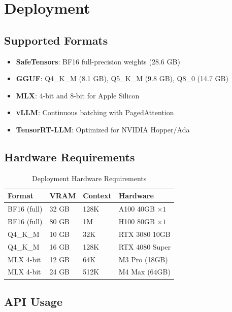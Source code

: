 \documentclass[11pt,a4paper]{article}
\begin{document}
\section{Deployment}

\subsection{Supported Formats}

\begin{itemize}
    \item \textbf{SafeTensors}: BF16 full-precision weights (28.6 GB)
    \item \textbf{GGUF}: Q4\_K\_M (8.1 GB), Q5\_K\_M (9.8 GB), Q8\_0 (14.7 GB)
    \item \textbf{MLX}: 4-bit and 8-bit for Apple Silicon
    \item \textbf{vLLM}: Continuous batching with PagedAttention
    \item \textbf{TensorRT-LLM}: Optimized for NVIDIA Hopper/Ada
\end{itemize}

\subsection{Hardware Requirements}

\begin{table}[H]
\centering
\begin{tabular}{llll}
\toprule
\textbf{Format} & \textbf{VRAM} & \textbf{Context} & \textbf{Hardware} \\
\midrule
BF16 (full)     & 32 GB & 128K  & A100 40GB $\times 1$ \\
BF16 (full)     & 80 GB & 1M    & H100 80GB $\times 1$ \\
Q4\_K\_M        & 10 GB & 32K   & RTX 3080 10GB \\
Q4\_K\_M        & 16 GB & 128K  & RTX 4080 Super \\
MLX 4-bit       & 12 GB & 64K   & M3 Pro (18GB) \\
MLX 4-bit       & 24 GB & 512K  & M4 Max (64GB) \\
\bottomrule
\end{tabular}
\caption{Deployment Hardware Requirements}
\end{table}

\subsection{API Usage}
\end{document}
